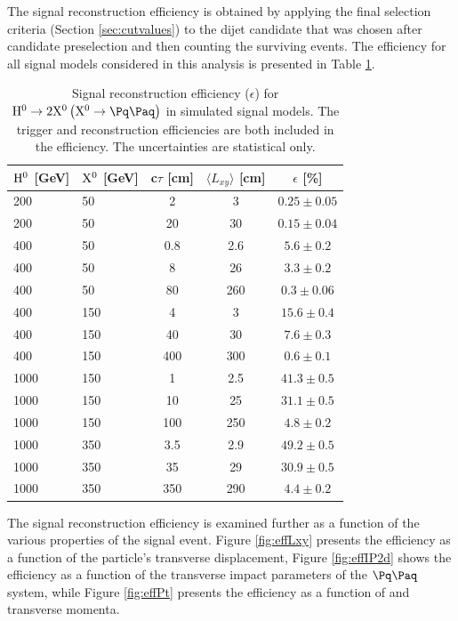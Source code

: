 The signal reconstruction efficiency is obtained by applying the final selection
criteria (Section \ref{sec:cutvalues}) to the dijet candidate that was chosen 
after candidate preselection and then counting the surviving events.
The efficiency for all signal models considered in this analysis
is presented in Table 
\ref{tab:sigeff}. 

\begin{table}[htbp]
\centering
\caption{
Signal reconstruction efficiency ($\epsilon$) for $\Higgs \to 2\X \left(\X \to \qq\right)$ 
in simulated signal models.
The trigger and reconstruction efficiencies are both included in the efficiency.
The uncertainties are statistical only.\label{tab:sigeff}}
\vspace{0.1cm}
\begin{tabular}{llccc}
\hline
$\mathrm{H}^{0}$ [GeV] & $\mathrm{X^{0}}$ [GeV] & c$\tau$ [cm] & $\langle L_{xy} \rangle$ [cm] & $\epsilon$ [\%] \\
\hline
200 & 50 & 2 & 3 & $0.25 \pm 0.05$ \\
200 & 50 & 20 & 30 & $0.15 \pm 0.04$ \\
\hline
400 & 50 & 0.8 & 2.6 & $5.6 \pm 0.2$ \\
400 & 50 & 8 & 26 &  $3.3 \pm 0.2$ \\
400 & 50 & 80 & 260 & $0.3 \pm 0.06$ \\
\hline
400 & 150 & 4 & 3 & $15.6 \pm 0.4$ \\
400 & 150 & 40 & 30 & $7.6 \pm 0.3$ \\
400 & 150 & 400 & 300 & $0.6 \pm 0.1$ \\
\hline
1000 & 150 & 1 & 2.5 & $41.3 \pm 0.5$ \\
1000 & 150 & 10 & 25 & $31.1 \pm 0.5$ \\
1000 & 150 & 100 & 250 & $4.8 \pm 0.2$ \\
\hline
1000 & 350 & 3.5 & 2.9 & $49.2 \pm 0.5$ \\
1000 & 350 & 35 & 29 & $30.9 \pm 0.5$ \\
1000 & 350 & 350 & 290 & $4.4 \pm 0.2$ \\
\hline

\end{tabular}
\end{table}

The signal reconstruction efficiency is examined further as a function of the various
properties of the signal event. 
Figure \ref{fig:effLxy} presents the efficiency as a function of the \X particle's
transverse displacement, Figure \ref{fig:effIP2d} shows the efficiency as a function of
the transverse impact parameters of the $\qq$ system, while Figure \ref{fig:effPt} presents
the efficiency as a function of \Higgs and \X transverse momenta.

